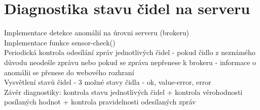 \section{Diagnostika stavu čidel na serveru} \label{sec:example_xor}

Implementace detekce anomálií na úrovni serveru (brokeru) \\
Implementace funkce sensor-check() \\
Periodická kontrola odesílání zpráv jednotlivých čidel - pokud čidlo z neznámého důvodu neodešle zprávu nebo pokud se zpráva nepřenese k brokeru - informace o anomálii se přenese do webového rozhraní \\
Vysvětlení stavů čidel - 3 možné stavy čidla - ok, value-error, error \\

Závěr diagnostiky: kontrola stavu jednotlivých čidel + kontrola věrohodnosti posílaných hodnot + kontrola pravidelnosti odesílaných zpráv